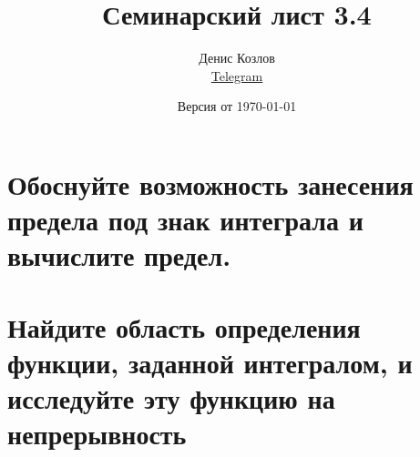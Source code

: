 \documentclass[a4paper, fleqn]{article}
\title{Семинарский лист 3.4}
\author{
    Денис Козлов         \\ \href{https://t.me/DKozl50}{Telegram} \and
}
\date{Версия от {\ddmmyyyydate\today} \currenttime}
\begin{document}
\maketitle


\section*{Обоснуйте возможность занесения предела под знак интеграла и вычислите предел.}






\section*{Найдите область определения функции, заданной интегралом, 
    и исследуйте эту функцию на непрерывность}
\end{document}
